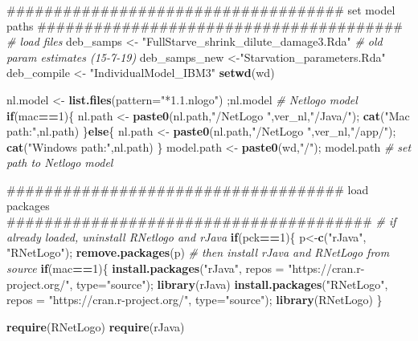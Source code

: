 \documentclass[10,portrait]{article}
\newenvironment{Shaded}{\begin{snugshade}}{\end{snugshade}}
\newcommand{\KeywordTok}[1]{\textcolor[rgb]{0.13,0.29,0.53}{\textbf{#1}}}
\newcommand{\DataTypeTok}[1]{\textcolor[rgb]{0.13,0.29,0.53}{#1}}
\newcommand{\DecValTok}[1]{\textcolor[rgb]{0.00,0.00,0.81}{#1}}
\newcommand{\StringTok}[1]{\textcolor[rgb]{0.31,0.60,0.02}{#1}}
\newcommand{\CommentTok}[1]{\textcolor[rgb]{0.56,0.35,0.01}{\textit{#1}}}
\newcommand{\ControlFlowTok}[1]{\textcolor[rgb]{0.13,0.29,0.53}{\textbf{#1}}}
\newcommand{\OperatorTok}[1]{\textcolor[rgb]{0.81,0.36,0.00}{\textbf{#1}}}
\newcommand{\NormalTok}[1]{#1}
\begin{document}
\begin{Shaded}
\begin{Highlighting}[]
\NormalTok{####################################  set model paths #######################################}
\CommentTok{# load files}
\NormalTok{deb_samps <-}\StringTok{ "FullStarve_shrink_dilute_damage3.Rda"} \CommentTok{# old param estimates (15-7-19)}
\NormalTok{deb_samps_new <-}\StringTok{"Starvation_parameters.Rda"}
\NormalTok{deb_compile <-}\StringTok{ "IndividualModel_IBM3"}
\KeywordTok{setwd}\NormalTok{(wd)}

\NormalTok{nl.model <-}\StringTok{ }\KeywordTok{list.files}\NormalTok{(}\DataTypeTok{pattern=}\StringTok{"*1.1.nlogo"}\NormalTok{) ;nl.model }\CommentTok{# Netlogo model}
\ControlFlowTok{if}\NormalTok{(mac}\OperatorTok{==}\DecValTok{1}\NormalTok{)\{}
\NormalTok{  nl.path <-}\StringTok{ }\KeywordTok{paste0}\NormalTok{(nl.path,}\StringTok{"/NetLogo "}\NormalTok{,ver_nl,}\StringTok{"/Java/"}\NormalTok{); }\KeywordTok{cat}\NormalTok{(}\StringTok{"Mac path:"}\NormalTok{,nl.path)}
\NormalTok{\}}\ControlFlowTok{else}\NormalTok{\{}
\NormalTok{  nl.path <-}\StringTok{ }\KeywordTok{paste0}\NormalTok{(nl.path,}\StringTok{"/NetLogo "}\NormalTok{,ver_nl,}\StringTok{"/app/"}\NormalTok{); }\KeywordTok{cat}\NormalTok{(}\StringTok{"Windows path:"}\NormalTok{,nl.path)}
\NormalTok{\}}
\NormalTok{model.path <-}\StringTok{ }\KeywordTok{paste0}\NormalTok{(wd,}\StringTok{"/"}\NormalTok{); model.path }\CommentTok{# set path to Netlogo model   }

\NormalTok{####################################  load packages #######################################}
\CommentTok{# if already loaded, uninstall RNetlogo and rJava}
\ControlFlowTok{if}\NormalTok{(pck}\OperatorTok{==}\DecValTok{1}\NormalTok{)\{}
\NormalTok{  p<-}\KeywordTok{c}\NormalTok{(}\StringTok{"rJava"}\NormalTok{, }\StringTok{"RNetLogo"}\NormalTok{); }\KeywordTok{remove.packages}\NormalTok{(p)}
  \CommentTok{# then install rJava and RNetLogo from source}
  \ControlFlowTok{if}\NormalTok{(mac}\OperatorTok{==}\DecValTok{1}\NormalTok{)\{}
    \KeywordTok{install.packages}\NormalTok{(}\StringTok{"rJava"}\NormalTok{, }\DataTypeTok{repos =} \StringTok{"https://cran.r-project.org/"}\NormalTok{, }\DataTypeTok{type=}\StringTok{"source"}\NormalTok{); }\KeywordTok{library}\NormalTok{(rJava)}
    \KeywordTok{install.packages}\NormalTok{(}\StringTok{"RNetLogo"}\NormalTok{, }\DataTypeTok{repos =} \StringTok{"https://cran.r-project.org/"}\NormalTok{, }\DataTypeTok{type=}\StringTok{"source"}\NormalTok{); }\KeywordTok{library}\NormalTok{(RNetLogo)}
\NormalTok{  \}}
  
  \KeywordTok{require}\NormalTok{(RNetLogo)}
  \KeywordTok{require}\NormalTok{(rJava)}
  

\end{Highlighting}
\end{Shaded}
\end{document}
